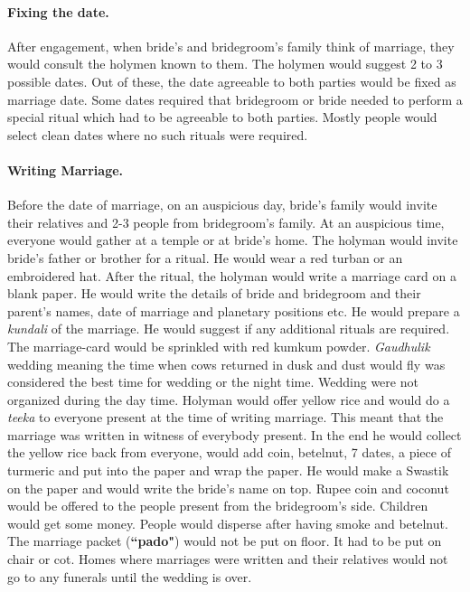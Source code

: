 \paragraph{Fixing the date.} After engagement, when bride's and bridegroom's family
think of marriage, they would consult the holymen known to them. The holymen
would suggest 2 to 3 possible dates. Out of these, the date agreeable to both
parties would be fixed as marriage date. Some dates required that bridegroom or
bride needed to perform a special ritual which had to be agreeable to both
parties. Mostly people would select clean dates where no such rituals were
required. 

\paragraph{Writing Marriage.} Before the date of marriage, on an auspicious day,
bride's family would invite their relatives and 2-3 people from bridegroom's family.
At an auspicious time, everyone would gather at a temple or at bride's home.
The holyman would invite bride's father or brother for a ritual. He would wear a
red turban or an embroidered hat. After the ritual, the holyman would write a
marriage card on a blank paper. He would write the details of bride and bridegroom
and their parent's names, date of marriage and planetary positions etc. He would
prepare a \textit{kundali} of the marriage. He would suggest if any additional
rituals are required. The marriage-card would be sprinkled with red kumkum
powder. \textit{Gaudhulik} wedding meaning the time when cows returned in dusk
and dust would fly was considered the best time for wedding or the night time.
Wedding were not organized during the day time. Holyman would offer yellow rice
and would do a \textit{teeka} to everyone present at the time of writing marriage. This
meant that the marriage was written in witness of everybody present. In the end
he would collect the yellow rice back from everyone, would add coin, betelnut,
7 dates, a piece of turmeric and put into the paper and wrap the paper. He would
make a Swastik on the paper and would write the bride's name on top. Rupee coin
and coconut would be offered to the people present from the bridegroom's side.
Children would get some money. People would disperse after having smoke and
betelnut. The marriage packet (\textbf{``pado"}) would not be put on floor. It
had to be put on chair or cot. Homes where marriages were written and their
relatives would not go to any funerals until the wedding is over.

